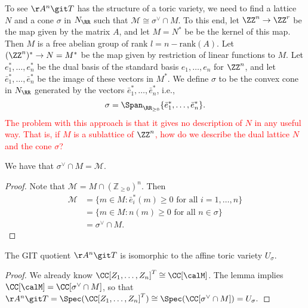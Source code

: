 To see $\AA^n \git T$ has the structure of a toric variety, we need to find a lattice $N$ and a cone $\sigma$ in $N_\RR$ such that $\mathcal{M} \cong \sigma^\vee \cap M$.
To this end, let $\ZZ^n \to \ZZ^r$ be the map given by the matrix $A$, and let $M = N^*$ be be the kernel of this map.
Then $M$ is a free abelian group of rank $l = n - \mathrm{rank}(A)$.
Let $(\ZZ^n)^* \to N = M^*$ be the map given by restriction of linear functions to $M$.
Let $e_1^*, \ldots, e_n^*$ be the dual basis of the standard basis $e_1, \ldots, e_n$ for $\ZZ^n$, and let $\bar{e}_1^*, \ldots, \bar{e}_n^*$ be the image of these vectors in $M^*$.
We define $\sigma$ to be the convex cone in $N_\RR$ generated by the vectors $\bar{e}_1^*, \ldots, \bar{e}_n^*$, i.e.,
$$\sigma = \Span_{\RR_{\ge 0}}\{ \bar{e}_1^* , \ldots, \bar{e}_n^*\}.$$
\textcolor{red}{The problem with this approach is that it gives no description of $N$ in any useful way.
That is, if $M$ is a sublattice of $\ZZ^n$, how do we describe the dual lattice $N$ and the cone $\sigma$?}

\begin{lemma}
We have that $\sigma^\vee \cap M = \mathcal{M}$.
\end{lemma}
\begin{proof}
Note that $\mathcal{M} = M \cap (\mathbb{Z}_{\ge 0})^n$.
Then
\begin{align*}
	\mathcal{M} &= \{m \in M : \bar{e}_i^*(m) \ge 0 \text{ for all } i = 1, \ldots, n\} \\
			&= \{m \in M : n(m) \ge 0 \text{ for all } n \in \sigma\} \\
			&= \sigma^\vee \cap M.
\end{align*}
\end{proof}

\begin{corollary}
The GIT quotient $\AA^n \git T$ is isomorphic to the affine toric variety $U_\sigma$.
\end{corollary}
\begin{proof}
We already know $\CC[Z_1, \ldots, Z_n]^T \cong \CC[\calM]$.
The lemma implies $\CC[\calM] = \CC[\sigma^\vee \cap M]$, so that $\AA^n \git T = \Spec(\CC[Z_1, \ldots, Z_n]^T) \cong \Spec(\CC[\sigma^\vee \cap M]) = U_\sigma.$ 
\end{proof}

